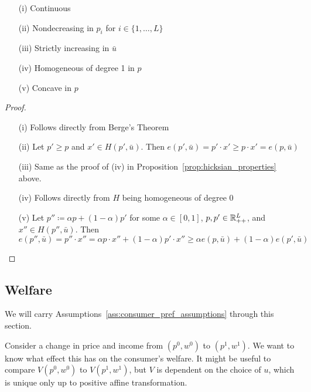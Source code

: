 \documentclass[12pt]{article}
\begin{document}
\begin{proposition}\label{prop:expend_properties}
	
	\begin{itemize}
		\item[(i)] Continuous
		\item[(ii)] Nondecreasing in $p_i$ for $i \in \{1,\dots,L\}$
		\item[(iii)] Strictly increasing in $\bar{u}$
		\item[(iv)] Homogeneous of degree 1 in $p$
		\item[(v)] Concave in $p$
	\end{itemize}
\end{proposition}
\begin{proof}
	
	\begin{itemize}
		\item[(i)] Follows directly from Berge's Theorem
		\item[(ii)] Let $p' \ge p$ and $x' \in H(p',\bar{u})$. Then $e(p',\bar{u}) = p' \cdot x' \ge p \cdot x' = e(p,\bar{u})$
		\item[(iii)] Same as the proof of (iv) in Proposition~\ref{prop:hicksian_properties} above. 
		\item[(iv)] Follows directly from $H$ being homogeneous of degree 0
		\item[(v)] Let $p'' \coloneqq \alpha p + (1-\alpha)p'$ for some $\alpha \in [0,1]$, $p,p' \in \mathbb{R}^L_{++}$, and $x'' \in H(p'',\bar{u})$. Then
		\[
		e(p'',\bar{u}) = p'' \cdot x'' = \alpha p \cdot x'' + (1-\alpha) p' \cdot x'' \ge \alpha e(p,\bar{u}) + (1-\alpha)e(p',\bar{u})
		\]
	\end{itemize}
\end{proof}

\subsection{Welfare}

\begin{remark}
	We will carry Assumptions~\ref{ass:consumer_pref_assumptions} through this section.
\end{remark}

\begin{remark}
	Consider a change in price and income from $(p^0,w^0)$ to $(p^1,w^1)$. We want to know what effect this has on the consumer's welfare. It might be useful to compare $V(p^0,w^0)$ to $V(p^1,w^1)$, but $V$ is dependent on the choice of $u$, which is unique only up to positive affine transformation.
\end{remark}
\end{document}
